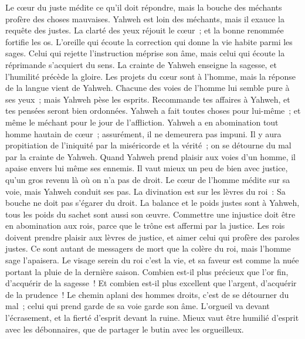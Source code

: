 \begin{multicols}{2}
Le cœur du juste médite ce qu'il doit répondre, mais la bouche des méchants profère des choses mauvaises.
Yahweh est loin des méchants, mais il exauce la requête des justes.
La clarté des yeux réjouit le cœur~; et la bonne renommée fortifie les os.
L'oreille qui écoute la correction qui donne la vie habite parmi les sages.
Celui qui rejette l'instruction méprise son âme, mais celui qui écoute la réprimande s'acquiert du sens.
La crainte de Yahweh enseigne la sagesse, et l'humilité précède la gloire.
\VerseOne{}Les projets du cœur sont à l'homme, mais la réponse de la langue vient de Yahweh.
Chacune des voies de l'homme lui semble pure à ses yeux~; mais Yahweh pèse les esprits.
Recommande tes affaires à Yahweh, et tes pensées seront bien ordonnées.
Yahweh a fait toutes choses pour lui-même~; et même le méchant pour le jour de l'affliction.
Yahweh a en abomination tout homme hautain de cœur~; assurément, il ne demeurera pas impuni.
Il y aura propitiation de l'iniquité par la miséricorde et la vérité~; on se détourne du mal par la crainte de Yahweh. 
Quand Yahweh prend plaisir aux voies d'un homme, il apaise envers lui même ses ennemis.
Il vaut mieux un peu de bien avec justice, qu'un gros revenu là où on n'a pas de droit.
Le cœur de l'homme médite sur sa voie, mais Yahweh conduit ses pas.
La divination est sur les lèvres du roi~: Sa bouche ne doit pas s'égarer du droit.
La balance et le poids justes sont à Yahweh, tous les poids du sachet sont aussi son œuvre.
Commettre une injustice doit être en abomination aux rois, parce que le trône est affermi par la justice.
Les rois doivent prendre plaisir aux lèvres de justice, et aimer celui qui profère des paroles justes.
Ce sont autant de messagers de mort que la colère du roi, mais l'homme sage l'apaisera.
Le visage serein du roi c'est la vie, et sa faveur est comme la nuée portant la pluie de la dernière saison.
Combien est-il plus précieux que l'or fin, d'acquérir de la sagesse~! Et combien est-il plus excellent que l'argent, d'acquérir de la prudence~! 
Le chemin aplani des hommes droits, c'est de se détourner du mal~; celui qui prend garde de sa voie garde son âme.
L'orgueil va devant l'écrasement, et la fierté d'esprit devant la ruine.
Mieux vaut être humilié d'esprit avec les débonnaires, que de partager le butin avec les orgueilleux.

\end{multicols}
